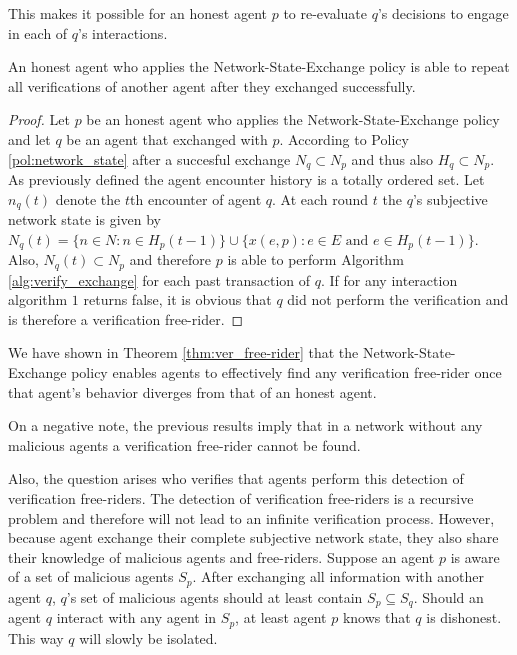 This makes it possible for an honest agent $p$ to re-evaluate $q$'s decisions to engage in each of $q$'s 
interactions.

\begin{thm}
    \label{thm:ver_free-rider}
    An honest agent who applies the Network-State-Exchange policy is able to repeat all verifications
    of another agent after they exchanged successfully.
\end{thm}
\begin{proof}
    Let $p$ be an honest agent who applies the Network-State-Exchange policy and let $q$ be an agent
    that exchanged with $p$. According to Policy \ref{pol:network_state} after a succesful exchange
    $N_q \subset N_p$ and thus also $H_q \subset N_p$. As previously defined the agent encounter
    history is a totally ordered set. Let $n_q(t)$ denote the $t$th encounter of agent $q$. At each
    round $t$ the $q$'s subjective network state is given by $N_q(t) = \{ n \in N : n \in H_p(t-1) \} \cup \{ x(e, p) : e \in E \text{ and } e \in H_p(t-1) \}$.
    Also, $N_q(t) \subset N_p$ and therefore $p$ is able to perform Algorithm \ref{alg:verify_exchange}
    for each past transaction of $q$. If for any interaction algorithm $1$ returns false, it is 
    obvious that $q$ did not perform the verification and is therefore a verification free-rider.
\end{proof}

We have shown in Theorem \ref{thm:ver_free-rider} that the Network-State-Exchange policy enables 
agents to effectively find any verification free-rider once that agent's behavior diverges from that
of an honest agent. 

On a negative note, the previous results imply that in a network without any malicious agents a 
verification free-rider cannot be found. 

Also, the question arises who verifies that agents perform this detection of verification 
free-riders. The detection of verification free-riders is a recursive problem and therefore will not
lead to an infinite verification process. However, because agent exchange their complete subjective
network state, they also share their knowledge of malicious agents and free-riders. Suppose an agent
$p$ is aware of a set of malicious agents $S_p$. After exchanging all information with another agent
$q$, $q$'s set of malicious agents should at least contain $S_p \subseteq S_q$. Should an agent $q$ 
interact with any agent in $S_p$, at least agent $p$ knows that $q$ is dishonest. This way $q$ will 
slowly be isolated.

